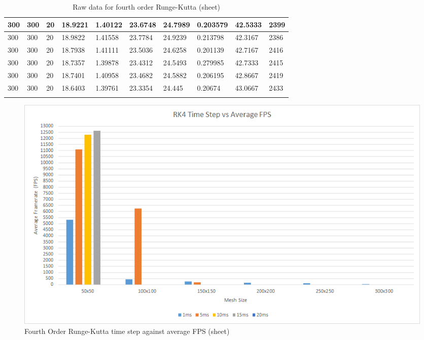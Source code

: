 \begin{landscape}
\begin{longtable}{ | l | l | l | l | l | l | l | l | l | l | }
300 & 300 & 20 & 18.9221 & 1.40122 & 23.6748 & 24.7989 & 0.203579 & 42.5333 & 2399\\ \hline
300 & 300 & 20 & 18.9822 & 1.41558 & 23.7784 & 24.9239 & 0.213798 & 42.3167 & 2386\\ \hline
300 & 300 & 20 & 18.7938 & 1.41111 & 23.5036 & 24.6258 & 0.201139 & 42.7167 & 2416\\ \hline
300 & 300 & 20 & 18.7357 & 1.39878 & 23.4312 & 24.5493 & 0.279985 & 42.7333 & 2415\\ \hline
300 & 300 & 20 & 18.7401 & 1.40958 & 23.4682 & 24.5882 & 0.206195 & 42.8667 & 2419\\ \hline
300 & 300 & 20 & 18.6403 & 1.39761 & 23.3354 & 24.445 & 0.20674 & 43.0667 & 2433\\ \hline
   \caption{Raw data for fourth order Runge-Kutta (sheet)}
   \label{tab:rk4 raw sheet}
\end{longtable}

  \begin{figure}[!htb]
    \begin{center}
      \includegraphics{Figures/sheet_rk4_fps}
    \end{center}
    \caption{Fourth Order Runge-Kutta time step against average FPS (sheet)}
    \label{fig:rk4 fps sheet}
  \end{figure}
\end{landscape}
  
